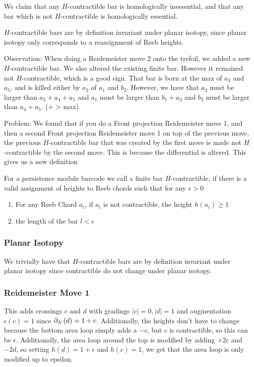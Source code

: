 \documentclass[11pt,oneside]{amsart}
\begin{document}
    We claim that any $H$-contractible bar is homologically inessential, and that any bar which is not $H$-contractible is homologically essential.

$H$-contractible bars are by definition invariant under planar isotopy, since planar isotopy only corresponds to a reassignment of Reeb heights.

Observation: When doing a Reidemeister move 2 onto the trefoil, we added a new $H$-contractible bar. We also altered the existing finite bar. However it remained not $H$-contractible, which is a good sign. That bar is born at the max of $a_3$ and $a_5$, and is killed either by $a_2$ of $a_1$ and $b_2$. However, we have that $a_2$ must be larger than $a_3 + a_4 + a_5$ and $a_1$ must be larger than $b_1 + a_3 $ and $b_2$ must be larger than $a_4 + a_5$. (+ > max).

Problem: We found that if you do a Front projection Reidemeister move 1, and then a second Front projection Reidemeister move 1 on top of the previous move, the previous $H$-contractible bar that was created by the first move is made not $H$-contractible by the second move. This is because the differential is altered. This gives us a new definition

    \begin{definition}
        For a persistence module barcode we call a finite bar $H$-contractible, if there is a valid assignment of heights to Reeb chords such that for any $\epsilon > 0$
        \begin{enumerate}
            \item For any Reeb Chord $a_i$, if $a_i$ is not contractible, the height $h(a_i) \geq 1$
            \item the length of the bar $l < \epsilon$
        \end{enumerate}
    \end{definition}

\subsubsection{Planar Isotopy}
We trivially have that $H$-contractible bars are by definition invariant under planar isotopy since contractible do not change under planar isotopy.

\subsubsection{Reidemeister Move 1} This adds crossings $c$ and $d$ with gradings $|c|=0,|d|=1$ and augmentation $\epsilon(c)=1$ since $\partial_{\Lambda'}(d)=1+c$. Additionally, the heights don't have to change because the bottom area loop simply adds a $-c$, but $c$ is contractible, so this can be $\epsilon$. Additionally, the area loop around the top is modified by adding $+2c$ and $-2d$, so setting $h(d)= 1 + \epsilon$ and $h(c) = 1$, we get that the area loop is only modified up to epsilon. 
\end{document}
